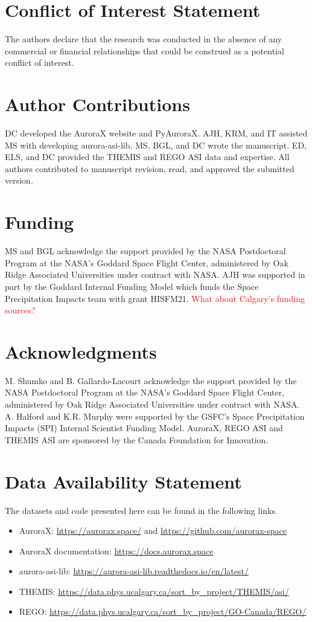 \documentclass[utf8]{FrontiersinHarvard} %
\begin{document}
\section*{Conflict of Interest Statement}
The authors declare that the research was conducted in the absence of any commercial or financial relationships that could be construed as a potential conflict of interest.

\section*{Author Contributions}
DC developed the AuroraX website and PyAuroraX. AJH, KRM, and IT assisted MS with developing aurora-asi-lib. MS, BGL, and DC wrote the manuscript. ED, ELS, and DC provided the THEMIS and REGO ASI data and expertise.  All authors contributed to manuscript revision, read, and approved the submitted version.

\section*{Funding}
MS and BGL acknowledge the support provided by the NASA Postdoctoral Program at the NASA's Goddard Space Flight Center, administered by Oak Ridge Associated Universities under contract with NASA. AJH was supported in part by the Goddard Internal Funding Model which funds the Space Precipitation Impacts team with grant HISFM21. \textcolor{red}{What about Calgary's funding sources?}

\section*{Acknowledgments}
M. Shumko and B. Gallardo-Lacourt acknowledge the support provided by the NASA Postdoctoral Program at the NASA’s Goddard Space Flight Center, administered by Oak Ridge Associated Universities under contract with NASA. A. Halford and K.R. Murphy were supported by the GSFC's Space Precipitation Impacts (SPI) Internal Scientist Funding Model. AuroraX, REGO ASI and THEMIS ASI are sponsored by the Canada Foundation for Innovation.

\section*{Data Availability Statement}
The datasets and code presented here can be found in the following links.
\begin{itemize}
    \item AuroraX: \url{https://aurorax.space/} and \url{https://github.com/aurorax-space}
    \item AuroraX documentation: \url{https://docs.aurorax.space}
    \item aurora-asi-lib: \url{https://aurora-asi-lib.readthedocs.io/en/latest/}
    \item THEMIS: \url{https://data.phys.ucalgary.ca/sort_by_project/THEMIS/asi/}
    \item REGO: \url{https://data.phys.ucalgary.ca/sort_by_project/GO-Canada/REGO/}
\end{itemize}
\end{document}
